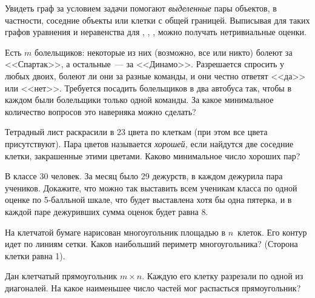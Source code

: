 Увидеть граф за условием задачи помогают \emph{выделенные} пары объектов,
в частности, соседние объекты или клетки с общей границей.
Выписывая для таких графов уравнения и неравенства для
\Vrt, \Edg, \CCm, можно получать нетривиальные оценки.

\begin{problems}

\item
Есть $m$ болельщиков: некоторые из них (возможно, все или никто) болеют за
<<Спартак>>, а остальные~--- за <<Динамо>>.
Разрешается спросить у любых двоих, болеют ли они за разные команды, и они
честно ответят <<да>> или <<нет>>.
Требуется посадить болельщиков в два автобуса так, чтобы в каждом были
болельщики только одной команды.
За какое минимальное количество вопросов это наверняка можно сделать?

\item
Тетрадный лист раскрасили в 23 цвета по клеткам (при этом все цвета
присутствуют).
Пара цветов называется \emph{хорошей,} если найдутся две соседние клетки,
закрашенные этими цветами.
Каково минимальное число хороших пар?

\item
В классе 30 человек.
За месяц было 29 дежурств, в каждом дежурила пара учеников.
Докажите, что можно так выставить всем ученикам класса по одной оценке
по 5-балльной шкале, что будет выставлена хотя бы одна пятерка, и в каждой паре
дежуривших сумма оценок будет равна 8.

\item
На клетчатой бумаге нарисован многоугольник площадью в $n$~клеток.
Его контур идет по линиям сетки.
Каков наибольший периметр многоугольника?
(Сторона клетки равна 1).

\item
Дан клетчатый прямоугольник $m \times n$.
Каждую его клетку разрезали по одной из диагоналей.
На какое наименьшее число частей мог распасться прямоугольник?

\end{problems}

\endgroup %

